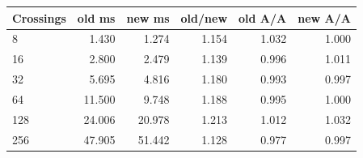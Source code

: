 \begin{center}\small
\begin{tabular}{@{}lrrrrr@{}}
\toprule
Crossings & old ms & new ms & old/new & old A/A & new A/A \\
\midrule
8 & 1.430 & 1.274 & 1.154 & 1.032 & 1.000 \\
16 & 2.800 & 2.479 & 1.139 & 0.996 & 1.011 \\
32 & 5.695 & 4.816 & 1.180 & 0.993 & 0.997 \\
64 & 11.500 & 9.748 & 1.188 & 0.995 & 1.000 \\
128 & 24.006 & 20.978 & 1.213 & 1.012 & 1.032 \\
256 & 47.905 & 51.442 & 1.128 & 0.977 & 0.997 \\
\bottomrule
\end{tabular}
\end{center}
